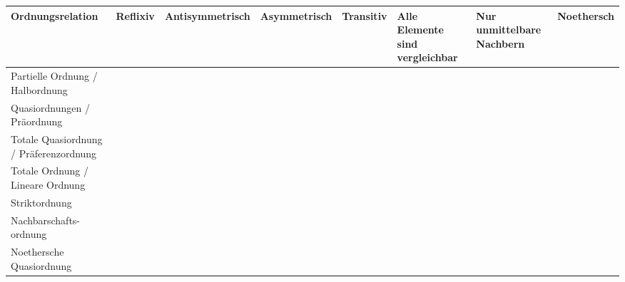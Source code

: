 \documentclass{article}
\begin{document}
\large
\begin{adjustbox}{center}
	\setlength{\extrarowheight}{10pt}
	\begin{tabular}{L{4cm}C{2cm}C{4cm}C{3cm}C{2cm}C{4cm}C{3cm}C{3cm}}
		Ordnungsrelation                       & Reflixiv     & Antisymmetrisch & Asymmetrisch & Transitiv    & Alle Elemente sind vergleichbar & Nur unmittelbare Nachbern & Noethersch   \\
		[10pt]\midrule
		Partielle Ordnung / Halbordnung        &  &     &              &  &                                 &                           &              \\
		Quasiordnungen / Präordnung            &  &                 &              &  &                                 &                           &              \\
		Totale Quasiordnung / Präferenzordnung &  &                 &              &  &                     &                           &              \\
		Totale Ordnung / Lineare Ordnung       &  &     &              &  &                     &                           &              \\
		Striktordnung                          &              &                 &  &  &                                 &                           &              \\
		Nachbarschafts-ordnung                 &              &                 &  &  &                                 &               &              \\
		Noethersche Quasiordnung               &  &                 &              &  &                                 &                           &  \\
	\end{tabular}
\end{adjustbox}
\end{document}
